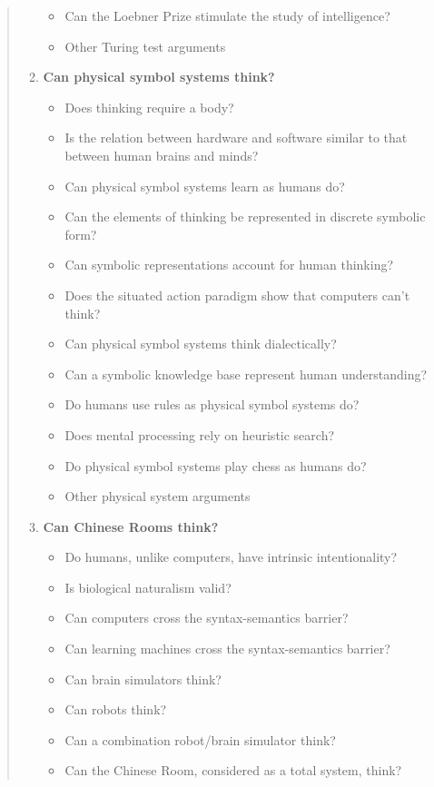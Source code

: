 \begin{quotation}
\begin{enumerate}
\begin{itemize}
        \item Can the Loebner Prize stimulate the study of intelligence?
        \item Other Turing test arguments
      \end{itemize}
    \item \textbf{Can physical symbol systems think?}
      \begin{itemize}
        \item Does thinking require a body?
        \item Is the relation between hardware and software similar to that between human brains and minds?
        \item Can physical symbol systems learn as humans do?
        \item Can the elements of thinking be represented in discrete symbolic form?
        \item Can symbolic representations account for human thinking?
        \item Does the situated action paradigm show that computers can't think?
        \item Can physical symbol systems think dialectically?
        \item Can a symbolic knowledge base represent human understanding?
        \item Do humans use rules as physical symbol systems do?
        \item Does mental processing rely on heuristic search?
        \item Do physical symbol systems play chess as humans do?
        \item Other physical system arguments
      \end{itemize}
    \item \textbf{Can Chinese Rooms think?}
      \begin{itemize}
        \item Do humans, unlike computers, have intrinsic intentionality?
        \item Is biological naturalism valid?
        \item Can computers cross the syntax-semantics barrier?
        \item Can learning machines cross the syntax-semantics barrier?
        \item Can brain simulators think?
        \item Can robots think?
        \item Can a combination robot/brain simulator think?
        \item Can the Chinese Room, considered as a total system, think?

\end{itemize}
\end{enumerate}
\end{quotation}
